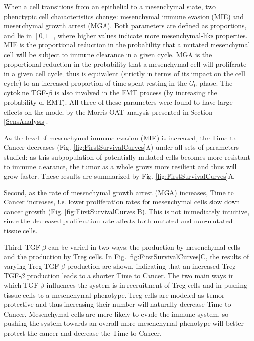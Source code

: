 \documentclass[11pt]{article}
\begin{document}
When a cell transitions from an epithelial to a mesenchymal state, two phenotypic cell characteristics change: mesenchymal immune evasion (MIE) and mesenchymal growth arrest (MGA).
Both parameters are defined as proportions, and lie in $[0,1]$, where higher values indicate more mesenchymal-like properties.
MIE is the proportional reduction in the probability that a mutated mesenchymal cell will be subject to immune clearance in a given cycle.
MGA is the proportional reduction in the probability that a mesenchymal cell will proliferate in a given cell cycle, thus is equivalent (strictly in terms of its impact on the cell cycle) to an increased proportion of time spent resting in the $G_0$ phase.
The cytokine TGF-$\beta$ is also involved in the EMT process (by increasing the probability of EMT). All three of these parameters were found to have large effects on the model by the Morris OAT analysis presented in Section \ref{SensAnalysis}.
\par 
As the level of mesenchymal immune evasion (MIE) is increased, the Time to Cancer decreases (Fig. \ref{fig:FirstSurvivalCurves}A) under all sets of parameters studied: as this subpopulation of potentially mutated cells becomes more resistant to immune clearance, the tumor as a whole grows more resilient and thus will grow faster.
These results are summarized by Fig. \ref{fig:FirstSurvivalCurves}A.

Second, as the rate of mesenchymal growth arrest (MGA) increases, Time to Cancer increases, i.e. lower proliferation rates for mesenchymal cells slow down cancer growth (Fig. \ref{fig:FirstSurvivalCurves}B).
This is not immediately intuitive, since the decreased proliferation rate affects both mutated and non-mutated tissue cells.

Third, TGF-$\beta$ can be varied in two ways: the production by mesenchymal cells and the production by Treg cells.
In Fig. \ref{fig:FirstSurvivalCurves}C, the results of varying Treg TGF-$\beta$ production are shown, indicating that an increased Treg TGF-$\beta$ production leads to a shorter Time to Cancer.
The two main ways in which TGF-$\beta$ influences the system is in recruitment of Treg cells and in pushing tissue cells to a mesenchymal phenotype.
Treg cells are modeled as tumor-protective and thus increasing their number will naturally decrease Time to Cancer.
Mesenchymal cells are more likely to evade the immune system, so pushing the system towards an overall more mesenchymal phenotype will better protect the cancer and decrease the Time to Cancer.
\end{document}
